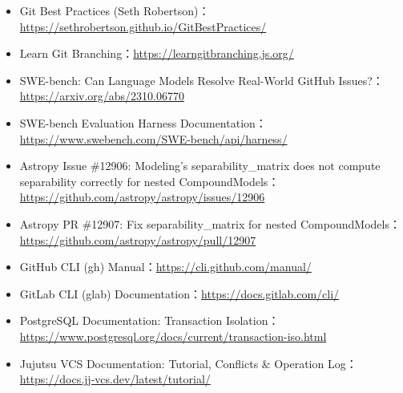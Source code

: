 \documentclass[UTF8,a4paper,11pt,fontset=fandol]{ctexart}
\begin{document}
\begin{itemize}
\item Git Best Practices (Seth Robertson)：\url{https://sethrobertson.github.io/GitBestPractices/}

\item Learn Git Branching：\url{https://learngitbranching.js.org/}

\item SWE-bench: Can Language Models Resolve Real-World GitHub Issues?：\url{https://arxiv.org/abs/2310.06770}

\item SWE-bench Evaluation Harness Documentation：\url{https://www.swebench.com/SWE-bench/api/harness/}

\item Astropy Issue \#12906: Modeling's separability\_matrix does not compute separability correctly for nested CompoundModels：\url{https://github.com/astropy/astropy/issues/12906}

\item Astropy PR \#12907: Fix separability\_matrix for nested CompoundModels：\url{https://github.com/astropy/astropy/pull/12907}

\item GitHub CLI (gh) Manual：\url{https://cli.github.com/manual/}

\item GitLab CLI (glab) Documentation：\url{https://docs.gitlab.com/cli/}

\item PostgreSQL Documentation: Transaction Isolation：\url{https://www.postgresql.org/docs/current/transaction-iso.html}

\item Jujutsu VCS Documentation: Tutorial, Conflicts \& Operation Log：\url{https://docs.jj-vcs.dev/latest/tutorial/}

\end{itemize}
\end{document}
